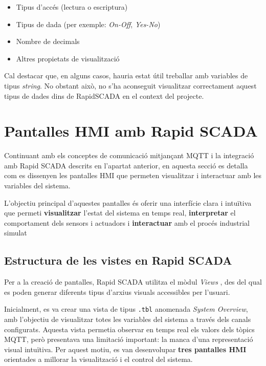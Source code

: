 \documentclass[a4paper,11pt,DIV=13,headings=normal,abstract=true,twoside=semi]{article}
\begin{document}
\begin{itemize}
    \item Tipus d'accés (lectura o escriptura)
    \item Tipus de dada (per exemple: \textit{On-Off}, \textit{Yes-No})
    \item Nombre de decimals
    \item Altres propietats de visualització
\end{itemize}

Cal destacar que, en alguns casos, hauria estat útil treballar amb variables de tipus \textit{string}. No obstant això, no s'ha aconseguit visualitzar correctament aquest tipus de dades dins de RapidSCADA en el context del projecte.


\newpage
\section{Pantalles HMI amb Rapid SCADA}
\label{sec:hmi}
Continuant amb els conceptes de comunicació mitjançant MQTT i la integració amb Rapid SCADA descrits en l'apartat anterior, en aquesta secció es detalla com es dissenyen les pantalles HMI que permeten visualitzar i interactuar amb les variables del sistema.

L'objectiu principal d'aquestes pantalles és oferir una interfície clara i intuïtiva que permeti \textbf{visualitzar} l'estat del sistema en temps real, \textbf{interpretar} el comportament dels sensors i actuadors i \textbf{interactuar} amb el procés industrial simulat


\subsection{Estructura de les vistes en Rapid SCADA}

Per a la creació de pantalles, Rapid SCADA utilitza el mòdul \textit{Views} \cite{rapidscada_views}, des del qual es poden generar diferents tipus d'arxius visuals accessibles per l'usuari.

Inicialment, es va crear una vista de tipus \texttt{.tbl} anomenada \textit{System Overview}, amb l'objectiu de visualitzar totes les variables del sistema a través dels canals configurats. Aquesta vista permetia observar en temps real els valors dels tòpics MQTT, però presentava una limitació important: la manca d'una representació visual intuïtiva. Per aquest motiu, es van desenvolupar \textbf{tres pantalles HMI} orientades a millorar la visualització i el control del sistema.
\end{document}

